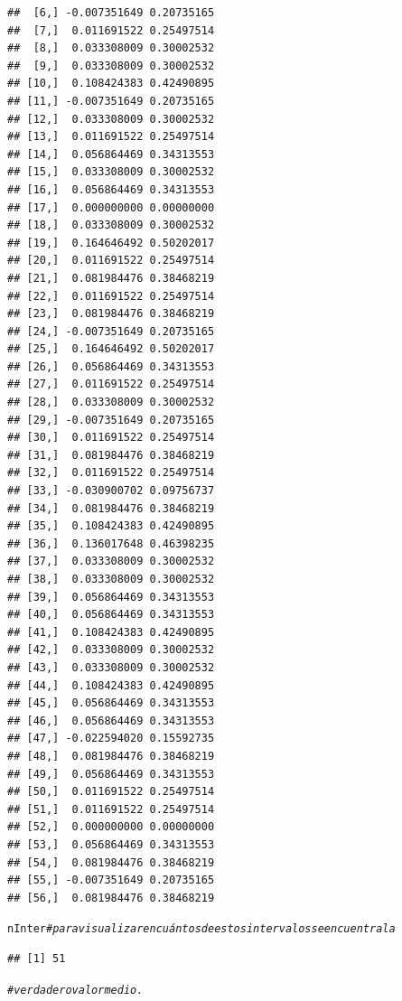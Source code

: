 \documentclass[12pt,letterpaper]{article}\usepackage[]{graphicx}\usepackage[]{color}
\makeatletter
\newcommand{\hlcom}[1]{\textcolor[rgb]{0.678,0.584,0.686}{\textit{#1}}}%
\newcommand{\hlstd}[1]{\textcolor[rgb]{0.345,0.345,0.345}{#1}}%
\newenvironment{kframe}{%
 \def\at@end@of@kframe{}%
 \ifinner\ifhmode%
  \def\at@end@of@kframe{\end{minipage}}%
  \begin{minipage}{\columnwidth}%
 \fi\fi%
 \def\FrameCommand##1{\hskip\@totalleftmargin \hskip-\fboxsep
 \colorbox{shadecolor}{##1}\hskip-\fboxsep
     \hskip-\linewidth \hskip-\@totalleftmargin \hskip\columnwidth}%
 \MakeFramed {\advance\hsize-\width
   \@totalleftmargin\z@ \linewidth\hsize
   \@setminipage}}%
 {\par\unskip\endMakeFramed%
 \at@end@of@kframe}
\newenvironment{knitrout}{}{} %
\makeatother
\begin{document}
\begin{knitrout}
\begin{kframe}
\begin{verbatim}
##  [6,] -0.007351649 0.20735165
##  [7,]  0.011691522 0.25497514
##  [8,]  0.033308009 0.30002532
##  [9,]  0.033308009 0.30002532
## [10,]  0.108424383 0.42490895
## [11,] -0.007351649 0.20735165
## [12,]  0.033308009 0.30002532
## [13,]  0.011691522 0.25497514
## [14,]  0.056864469 0.34313553
## [15,]  0.033308009 0.30002532
## [16,]  0.056864469 0.34313553
## [17,]  0.000000000 0.00000000
## [18,]  0.033308009 0.30002532
## [19,]  0.164646492 0.50202017
## [20,]  0.011691522 0.25497514
## [21,]  0.081984476 0.38468219
## [22,]  0.011691522 0.25497514
## [23,]  0.081984476 0.38468219
## [24,] -0.007351649 0.20735165
## [25,]  0.164646492 0.50202017
## [26,]  0.056864469 0.34313553
## [27,]  0.011691522 0.25497514
## [28,]  0.033308009 0.30002532
## [29,] -0.007351649 0.20735165
## [30,]  0.011691522 0.25497514
## [31,]  0.081984476 0.38468219
## [32,]  0.011691522 0.25497514
## [33,] -0.030900702 0.09756737
## [34,]  0.081984476 0.38468219
## [35,]  0.108424383 0.42490895
## [36,]  0.136017648 0.46398235
## [37,]  0.033308009 0.30002532
## [38,]  0.033308009 0.30002532
## [39,]  0.056864469 0.34313553
## [40,]  0.056864469 0.34313553
## [41,]  0.108424383 0.42490895
## [42,]  0.033308009 0.30002532
## [43,]  0.033308009 0.30002532
## [44,]  0.108424383 0.42490895
## [45,]  0.056864469 0.34313553
## [46,]  0.056864469 0.34313553
## [47,] -0.022594020 0.15592735
## [48,]  0.081984476 0.38468219
## [49,]  0.056864469 0.34313553
## [50,]  0.011691522 0.25497514
## [51,]  0.011691522 0.25497514
## [52,]  0.000000000 0.00000000
## [53,]  0.056864469 0.34313553
## [54,]  0.081984476 0.38468219
## [55,] -0.007351649 0.20735165
## [56,]  0.081984476 0.38468219
\end{verbatim}
\begin{alltt}
\hlstd{nInter} \hlcom{# para visualizar en cuántos de estos intervalos se encuentra la }
\end{alltt}
\begin{verbatim}
## [1] 51
\end{verbatim}
\begin{alltt}
\hlcom{# verdadero valor medio.}
\end{alltt}
\end{kframe}
\end{knitrout}
\end{document}
